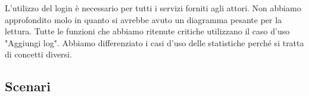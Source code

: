 \documentclass[a4paper]{article}
\begin{document}
L'utilizzo del login è necessario per tutti i servizi forniti agli attori.
Non abbiamo approfondito molo in quanto si avrebbe avuto un diagramma pesante per la lettura.
Tutte le funzioni che abbiamo ritenute critiche utilizzano il caso d'uso "Aggiungi log".
Abbiamo differenziato i casi d'uso delle statistiche perché si tratta di concetti diversi.



\subsection{Scenari}
\end{document}
